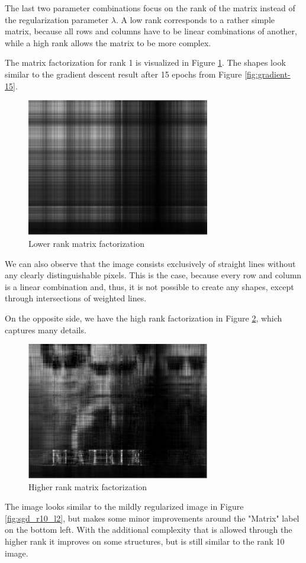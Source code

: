 \documentclass{support/acm_proc_article-sp}
\begin{document}
    The last two parameter combinations focus on the rank of the matrix instead of the regularization parameter $\lambda$.
    A low rank corresponds to a rather simple matrix, because all rows and columns have to be linear combinations of another,
    while a high rank allows the matrix to be more complex.

    The matrix factorization for rank 1 is visualized in Figure \ref{fig:sgd_r1_l0}.
    The shapes look similar to the gradient descent result after 15 epochs from Figure \ref{fig:gradient-15}.
    \begin{figure}[htbp]
        \centering
        \includegraphics[width=8cm]{images/sgd_r1_l0.png}
        \caption{Lower rank matrix factorization}
        \label{fig:sgd_r1_l0}
    \end{figure}
    We can also observe that the image consists exclusively of straight lines without any clearly distinguishable pixels.
    This is the case, because every row and column is a linear combination and, thus, it is not possible to create any shapes,
    except through intersections of weighted lines.

    On the opposite side, we have the high rank factorization in Figure \ref{fig:sgd_r20_l2}, which captures many details.
    \begin{figure}[htbp]
        \centering
        \includegraphics[width=8cm]{images/sgd_r20_l2.png}
        \caption{Higher rank matrix factorization}
        \label{fig:sgd_r20_l2}
    \end{figure}
    The image looks similar to the mildly regularized image in Figure \ref{fig:sgd_r10_l2}, but makes some minor
    improvements around the "Matrix" label on the bottom left.
    With the additional complexity that is allowed through the higher rank it improves on some structures, but is still
    similar to the rank 10 image.
\end{document}

